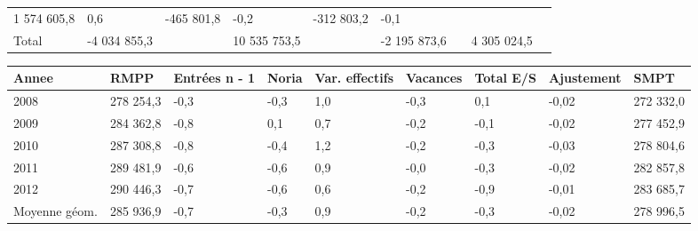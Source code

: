 \begin{longtable}[]{@{}lllllllll@{}}
\begin{minipage}[t]{0.16\columnwidth}
1 574 605,8\strut
\end{minipage} & \begin{minipage}[t]{0.06\columnwidth}\raggedright
0,6\strut
\end{minipage} & \begin{minipage}[t]{0.12\columnwidth}\raggedright
-465 801,8\strut
\end{minipage} & \begin{minipage}[t]{0.06\columnwidth}\raggedright
-0,2\strut
\end{minipage} & \begin{minipage}[t]{0.10\columnwidth}\raggedright
-312 803,2\strut
\end{minipage} & \begin{minipage}[t]{0.06\columnwidth}\raggedright
-0,1\strut
\end{minipage}\tabularnewline
\begin{minipage}[t]{0.05\columnwidth}\raggedright
Total\strut
\end{minipage} & \begin{minipage}[t]{0.10\columnwidth}\raggedright
-4 034 855,3\strut
\end{minipage} & \begin{minipage}[t]{0.06\columnwidth}\raggedright
\strut
\end{minipage} & \begin{minipage}[t]{0.16\columnwidth}\raggedright
10 535 753,5\strut
\end{minipage} & \begin{minipage}[t]{0.06\columnwidth}\raggedright
\strut
\end{minipage} & \begin{minipage}[t]{0.12\columnwidth}\raggedright
-2 195 873,6\strut
\end{minipage} & \begin{minipage}[t]{0.06\columnwidth}\raggedright
\strut
\end{minipage} & \begin{minipage}[t]{0.10\columnwidth}\raggedright
4 305 024,5\strut
\end{minipage} & \begin{minipage}[t]{0.06\columnwidth}\raggedright
\strut
\end{minipage}\tabularnewline
\bottomrule
\end{longtable}

\begin{longtable}[]{@{}lllllllll@{}}
\toprule
Annee & RMPP & Entrées n - 1 & Noria & Var. effectifs & Vacances & Total
E/S & Ajustement & SMPT\tabularnewline
\midrule
\endhead
2008 & 278 254,3 & -0,3 & -0,3 & 1,0 & -0,3 & 0,1 & -0,02 & 272
332,0\tabularnewline
2009 & 284 362,8 & -0,8 & 0,1 & 0,7 & -0,2 & -0,1 & -0,02 & 277
452,9\tabularnewline
2010 & 287 308,8 & -0,8 & -0,4 & 1,2 & -0,2 & -0,3 & -0,03 & 278
804,6\tabularnewline
2011 & 289 481,9 & -0,6 & -0,6 & 0,9 & -0,0 & -0,3 & -0,02 & 282
857,8\tabularnewline
2012 & 290 446,3 & -0,7 & -0,6 & 0,6 & -0,2 & -0,9 & -0,01 & 283
685,7\tabularnewline
Moyenne géom. & 285 936,9 & -0,7 & -0,3 & 0,9 & -0,2 & -0,3 & -0,02 &
278 996,5\tabularnewline
\bottomrule
\end{longtable}

